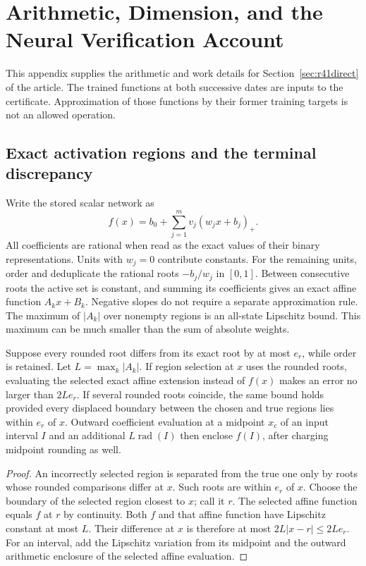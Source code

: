 \section{Arithmetic, Dimension, and the Neural Verification Account}
\label{app:r41arithmetic}
This appendix supplies the arithmetic and work details for
Section~\ref{sec:r41direct} of the article. The trained functions at both
successive dates are inputs to the certificate. Approximation of those
functions by their former training targets is not an allowed operation.

\subsection{Exact activation regions and the terminal discrepancy}
Write the stored scalar network as
\[
 f(x)=b_0+\sum_{j=1}^m v_j(w_jx+b_j)_+.
\]
All coefficients are rational when read as the exact values of their binary
representations. Units with $w_j=0$ contribute constants. For the remaining
units, order and deduplicate the rational roots $-b_j/w_j$ in $[0,1]$.
Between consecutive roots the active set is constant, and summing its
coefficients gives an exact affine function $A_kx+B_k$. Negative slopes do
not require a separate approximation rule. The maximum of $|A_k|$ over
nonempty regions is an all-state Lipschitz bound. This maximum can be much
smaller than the sum of absolute weights.

\begin{proposition}
\label{prop:r41compile}
Suppose every rounded root differs from its exact root by at most $e_r$,
while order is retained. Let $L=\max_k|A_k|$. If region selection at $x$
uses the rounded roots, evaluating the selected exact affine extension
instead of $f(x)$ makes an error no larger than $2Le_r$. If several rounded
roots coincide, the same bound holds provided every displaced boundary
between the chosen and true regions lies within $e_r$ of $x$. Outward
coefficient evaluation at a midpoint $x_c$ of an input interval $I$ and an
additional $L\operatorname{rad}(I)$ then enclose $f(I)$, after charging
midpoint rounding as well.
\end{proposition}
\begin{proof}
An incorrectly selected region is separated from the true one only by
roots whose rounded comparisons differ at $x$. Such roots are within
$e_r$ of $x$. Choose the boundary of the selected region closest to $x$;
call it $r$. The selected affine function equals $f$ at $r$ by continuity.
Both $f$ and that affine function have Lipschitz constant at most $L$.
Their difference at $x$ is therefore at most $2L|x-r|\leq2Le_r$.
For an interval, add the Lipschitz variation from its midpoint and the
outward arithmetic enclosure of the selected affine evaluation.
\end{proof}

